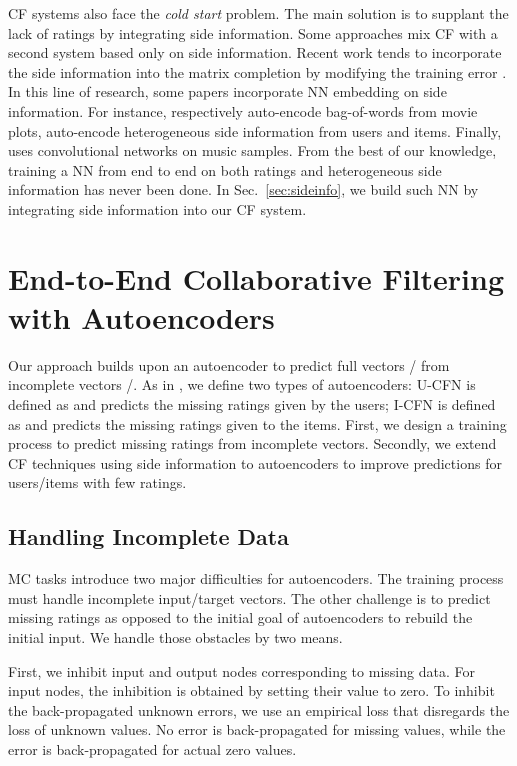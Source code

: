 \documentclass{article}
\begin{document}
CF systems also face the \emph{cold start} problem. The main solution is to supplant the lack of ratings by integrating side information. Some approaches \cite{Burke:2002} mix CF with a second system based only on side information. Recent work tends to incorporate the side information into the matrix completion by modifying the training error \cite{Adams2010,Chen2012,Rendle2010,Porteous2010}. 
In this line of research, some papers incorporate NN embedding on side information. For instance, \cite{Wang2014} respectively auto-encode bag-of-words from movie plots, \cite{Li2015} auto-encode heterogeneous side information from users and items. Finally, \cite{Wang2014b} uses convolutional networks on music samples. From the best of our knowledge, training a NN from end to end on both ratings and heterogeneous side information has never been done. In Sec.~\ref{sec:sideinfo}, we build such NN by integrating side information into our CF system.





\section{End-to-End Collaborative Filtering with Autoencoders }
\label{sec:model}

 
Our approach builds upon an autoencoder to predict full vectors / from incomplete vectors /. As in \cite{Salakhutdinov2008,Sedhain2015,Strub2015}, we define two types of autoencoders: U-CFN is defined as  and predicts the missing ratings given by the users; I-CFN is defined as  and predicts the missing ratings given to the items. First, we design a training process to predict missing ratings from incomplete vectors. Secondly, we extend CF techniques using side information to autoencoders to improve predictions for users/items with few ratings.




\subsection{Handling Incomplete Data}

MC tasks introduce two major difficulties for autoencoders. The training process must handle incomplete input/target vectors. The other challenge is to predict missing ratings as opposed to the initial goal of autoencoders to rebuild the initial input. We handle those obstacles by two means. 

First, we inhibit input and output nodes corresponding to missing data. For input nodes, the inhibition is obtained by setting their value to zero. To inhibit the back-propagated unknown errors, we use an empirical loss that disregards the loss of unknown values. No error is back-propagated for missing values, while the error is back-propagated for actual zero values.
\end{document}
